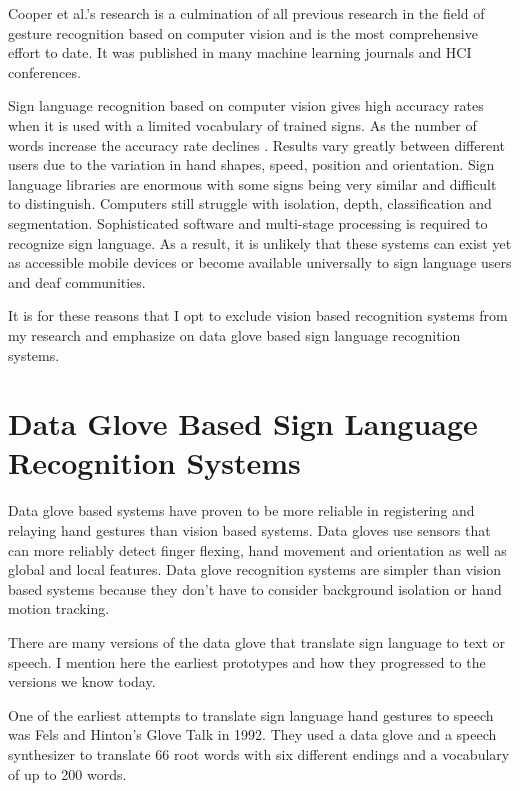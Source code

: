 Cooper et al.’s research is a culmination of all previous research in the field of gesture recognition based on computer vision and is the most comprehensive effort to date. It was published in many machine learning journals and HCI conferences. 

Sign language recognition based on computer vision gives high accuracy rates when it is used with a limited vocabulary of trained signs. As the number of words increase the accuracy rate declines  \parencite{Fang2003}. Results vary greatly between different users due to the variation in hand shapes, speed, position and orientation. Sign language libraries are enormous with some signs being very similar and difficult to distinguish. Computers still struggle with isolation, depth, classification and segmentation. Sophisticated software and multi-stage processing is required to recognize sign language. As a result, it is unlikely that these systems can exist yet as accessible mobile devices or become available universally to sign language users and deaf communities. 

It is for these reasons that I opt to exclude vision based recognition systems from my research and emphasize on data glove based sign language recognition systems. 


\section{Data Glove Based Sign Language Recognition Systems} 

Data glove based systems have proven to be more reliable in registering and relaying hand gestures than vision based systems. Data gloves use sensors that can more reliably detect finger flexing, hand movement and orientation \parencite{AnethaK2014} as well as global and local features. Data glove recognition systems are simpler than vision based systems because they don’t have to consider background isolation or hand motion tracking. 

There are many versions of the data glove that translate sign language to text or speech. I mention here the earliest prototypes and how they progressed to the versions we know today. 

One of the earliest attempts to translate sign language hand gestures to speech was Fels and Hinton’s Glove Talk \parencite{Fels1993} in 1992. They used a data glove and a speech synthesizer to translate 66 root words with six different endings and a vocabulary of up to 200 words. 

